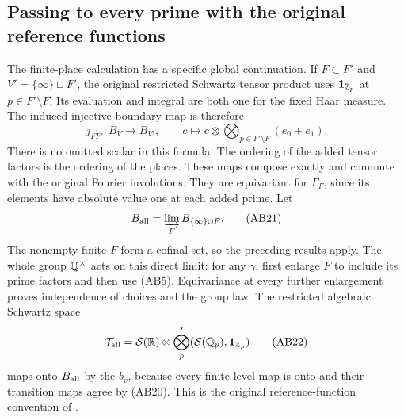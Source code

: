 \subsection{Passing to every prime with the original reference functions}
The finite-place calculation has a specific global continuation. If
$F\subset F'$ and $V'=\{\infty\}\sqcup F'$, the original restricted
Schwartz tensor product uses $\mathbf1_{\mathbb Z_p}$ at $p\in F'\setminus F$.
Its evaluation and integral are both one for the fixed Haar measure.
The induced injective boundary map is therefore
\[
 j_{FF'}:B_V\longrightarrow B_{V'},\qquad
 c\longmapsto c\otimes\bigotimes_{p\in F'\setminus F}(e_0+e_1).
 \tag{AB20}
\]
There is no omitted scalar in this formula. The ordering of the added
tensor factors is the ordering of the places. These maps compose exactly
and commute with the original Fourier involutions. They are equivariant
for $\Gamma_F$, since its elements have absolute value one at each added
prime. Let
\[
 B_{\rm all}=\varinjlim_F B_{\{\infty\}\cup F}.
 \tag{AB21}
\]
The nonempty finite $F$ form a cofinal set, so the preceding results apply.
The whole group $\mathbb Q^\times$ acts on this direct limit: for any $\gamma$,
first enlarge $F$ to include its prime factors and then use (AB5).
Equivariance at every further enlargement proves independence of choices
and the group law. The restricted algebraic Schwartz space
\[
 \mathcal T_{\rm all}=\mathcal S(\mathbb R)\otimes
              \bigotimes_{p}'(\mathcal S(\mathbb Q_p),\mathbf1_{\mathbb Z_p})
 \tag{AB22}
\]
maps onto $B_{\rm all}$ by the $b_v$, because every finite-level map is
onto and their transition maps agree by (AB20). This is the original
reference-function convention of \cite[Section III]{Connes1998}.

